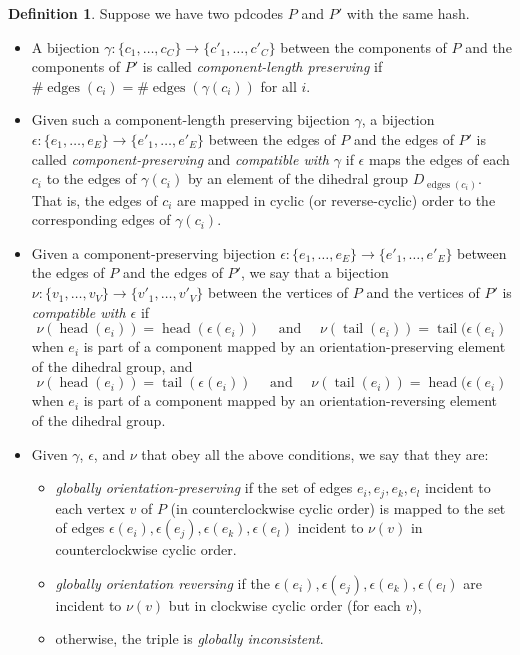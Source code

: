 \documentclass[amsmath,secnumarabic,floatfix,amssymb,nofootinbib,nobibnotes,letterpaper,11pt,tightenlines,showkeys]{revtex4}
\theoremstyle{definition}
\newtheorem{definition}[theorem]{Definition}
\newcommand{\edges}{\operatorname{edges}}
\newcommand{\head}{\operatorname{head}}
\newcommand{\tail}{\operatorname{tail}}
\begin{document}
\begin{definition}
Suppose we have two pdcodes $P$ and $P'$ with the same hash. 
\begin{itemize}
\item A bijection $\gamma: \{c_1,\dots,c_C\} \rightarrow \{c'_1,\dots,c'_C\}$ between the components of $P$ and the components of $P'$ is called \emph{component-length preserving} if $\# \edges(c_i) = \# \edges(\gamma(c_i))$ for all $i$.
\item Given such a component-length preserving bijection $\gamma$, a bijection $\epsilon : \{e_1,\dots,e_E\} \rightarrow \{e'_1,\dots,e'_E\}$ between the edges of $P$ and the edges of $P'$ is called \emph{component-preserving} and \emph{compatible with $\gamma$} if $\epsilon$ maps the edges of each $c_i$ to the edges of $\gamma(c_i)$ by an element of the dihedral group $D_{\edges(c_i)}$. That is, the edges of $c_i$ are mapped in cyclic (or reverse-cyclic) order to the corresponding edges of $\gamma(c_i)$. 
\item Given a component-preserving bijection $\epsilon : \{e_1,\dots,e_E\} \rightarrow \{e'_1,\dots,e'_E\}$ between the edges of $P$ and the edges of $P'$, we say that a bijection $\nu : \{v_1, \dots, v_V\} \rightarrow \{v'_1,\dots,v'_V\}$ between the vertices of $P$ and the vertices of $P'$ is \emph{compatible with $\epsilon$} if 
\begin{equation*}
\nu(\head(e_i)) = \head(\epsilon(e_i)) \quad \text{ and } \quad \nu(\tail(e_i)) = \tail(\epsilon(e_i)
\end{equation*}
when $e_i$ is part of a component mapped by an orientation-preserving element of the dihedral group, and 
\begin{equation*}
\nu(\head(e_i)) = \tail(\epsilon(e_i)) \quad \text{ and } \quad \nu(\tail(e_i)) = \head(\epsilon(e_i)
\end{equation*}
when $e_i$ is part of a component mapped by an orientation-reversing element of the dihedral group.
\item Given $\gamma$, $\epsilon$, and $\nu$ that obey all the above conditions, we say that they are:
\begin{itemize}
 \item \emph{globally orientation-preserving} if the set of edges $e_i, e_j, e_k, e_l$ incident to each vertex $v$ of $P$ (in counterclockwise cyclic order) is mapped to the set of edges $\epsilon(e_i), \epsilon(e_j), \epsilon(e_k), \epsilon(e_l)$ incident to $\nu(v)$ in counterclockwise cyclic order. 
 \item \emph{globally orientation reversing} if the $\epsilon(e_i), \epsilon(e_j), \epsilon(e_k), \epsilon(e_l)$ are incident to $\nu(v)$ but in clockwise cyclic order (for each $v$),
 \item otherwise, the triple is \emph{globally inconsistent}.
\end{itemize}
\end{itemize}
\end{definition}
\end{document}
